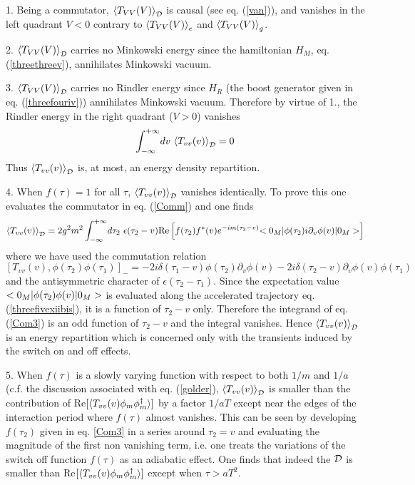 1. Being a commutator, $\mbox{$ \langle T_{VV}(V) \rangle $}_{{\cal D}}$ is causal (see
eq. (\ref{van})), and vanishes
in the left quadrant $V<0$ contrary to $\mbox{$ \langle T_{VV}(V) \rangle $}_{e}$ and
$\mbox{$ \langle T_{VV}(V) \rangle $}_{g}$.

2. $\mbox{$ \langle T_{VV}(V) \rangle $}_{{\cal D}}$ carries no Minkowski energy since
 the hamiltonian $H_M$, eq. (\ref{threethreev}), annihilates Minkowski vacuum.

3. $\mbox{$ \langle T_{VV}(V) \rangle $}_{{\cal D}}$ carries no Rindler energy since
$H_R$ (the boost generator given in eq. (\ref{threefouriv})) annihilates
Minkowski vacuum.
Therefore by virtue of 1.,
the Rindler energy in the right quadrant ($V>0$) vanishes
\begin{equation}
\int_{-\infty}^{+\infty} \! dv\ \bk{T_{vv}(v)}_{{\cal D}} =0
\label{Com2}
\end{equation}
Thus $\mbox{$ \langle T_{vv}(v) \rangle $}_{{\cal D}}$ is, at most, an energy density repartition.

4. When $f(\tau)=1$ for all $\tau$, $\mbox{$ \langle T_{vv}(v) \rangle $}_{{\cal D}}$ vanishes
identically.
To prove
this one evaluates
the commutator in eq. (\ref{Comm}) and one finds
\begin{eqnarray}
\mbox{$ \langle T_{vv}(v) \rangle $}_{{\cal D}}= 2g^2 m^2
\int_{-\infty}^{+\infty} \! d\tau_2\
\epsilon(\tau_2 - v)
\mbox{Re} \left[ f(\tau_2)   f^*(v)
e^{-i m( \tau_2 -v)}
\mbox{$ < 0_M \vert $} \phi(\tau_2) i\partial_v \phi(v) \mbox{$ \vert 0_M > $}
\right]
\nonumber\\
\label{Com3}
\end{eqnarray}
where we have used the commutation relation
\begin{equation}
\left[T_{vv}(v), \phi(\tau_2)\phi(\tau_1) \right]_- =
-2i \delta(\tau_1 -v)
\phi(\tau_2)
\partial_v \phi(v)
-2i \delta(\tau_2 -v)
\partial_v \phi(v)
\phi(\tau_1)
\label{Com4}
\end{equation}
and the antisymmetric character of $\epsilon(\tau_2 - \tau_1)$.
Since the expectation value $\mbox{$ < 0_M \vert $} \phi(\tau_2)\phi(v) \mbox{$ \vert 0_M > $}$ is
evaluated along the
accelerated trajectory eq. (\ref{threefivexiibis}),
it is a function of $\tau_2-v$ only. Therefore
the integrand of eq. (\ref{Com3}) is an odd function of $\tau_2-v$
and the integral vanishes.
Hence $\mbox{$ \langle T_{vv}(v) \rangle $}_{{\cal D}}$ is
an energy repartition which is concerned only with
the transients induced by the switch on and off effects.

5. When $f(\tau)$ is a slowly varying function with respect to
both $1/m$ and $1/a$ (c.f. the discussion associated with eq. (\ref{golder}),
$\mbox{$ \langle T_{vv}(v) \rangle $}_{{\cal D}}$ is smaller than the contribution of
Re$[\mbox{$ \langle T_{vv}(v)\phi_m\phi_m^\dagger \rangle $}]$ by a factor $1/aT$ except
near the edges of the interaction period where $f(\tau)$ almost
vanishes.
This can be seen by developing $f(\tau_2)$ given in eq. \ref{Com3} in a series
around $\tau_2 =v$ and evaluating the magnitude of the first non vanishing
term, i.e. one
treats the variations of the
switch off function $f(\tau)$ as an adiabatic effect.
One finds that indeed the $\cal{D}$ is smaller than
Re$[\mbox{$ \langle T_{vv}(v)\phi_m\phi_m^\dagger \rangle $}]$ except when $\tau > aT^2$.

